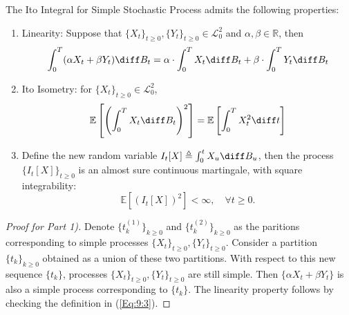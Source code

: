 \begin{proposition}\label{pro:9:1}
The Ito Integral for Simple Stochastic Process admits the following properties:
\begin{enumerate}
\item
Linearity: Suppose that $\{X_t\}_{t\ge0},\{Y_t\}_{t\ge0}\in\mathcal{L}_0^2$ and $\alpha,\beta\in\mathbb{R}$, then
\[
\int_0^T(\alpha X_t+\beta Y_t)\diff B_t = \alpha\cdot \int_0^TX_t\diff B_t + \beta\cdot\int_0^TY_t\diff B_t
\]
\item
Ito Isometry: for $\{X_t\}_{t\ge0}\in\mathcal{L}_0^2$,
\[
\mathbb{E}\left[
\left(\int_0^TX_t\diff B_t\right)^2
\right]
=
\mathbb{E}\left[
\int_0^TX_t^2\diff t
\right]
\]
\item
Define the new random variable $I_t[X]\triangleq \int_0^tX_u\diff B_u$, then the process $\{I_t[X]\}_{t\ge0}$ is an almost sure continuous martingale, with square integrability:
\[
\mathbb{E}[(I_t[X])^2]<\infty,\quad\forall t\ge0.
\]
\end{enumerate}
\end{proposition}
\begin{proof}[Proof for Part 1)]
Denote $\{t_k^{(1)}\}_{k\ge0}$ and $\{t_k^{(2)}\}_{k\ge0}$ as the paritions corresponding to simple processes $\{X_t\}_{t\ge0},\{Y_t\}_{t\ge0}$.
Consider a partition $\{t_k\}_{k\ge0}$  obtained as a union of these two partitions.
With respect to this new sequence $\{t_k\}$, processes $\{X_t\}_{t\ge0},\{Y_t\}_{t\ge0}$ are still simple.
Then $\{\alpha X_t+\beta Y_t\}$ is also a simple process corresponding to $\{t_k\}$.
The linearity property follows by checking the definition in (\ref{Eq:9:3}).
\end{proof}
